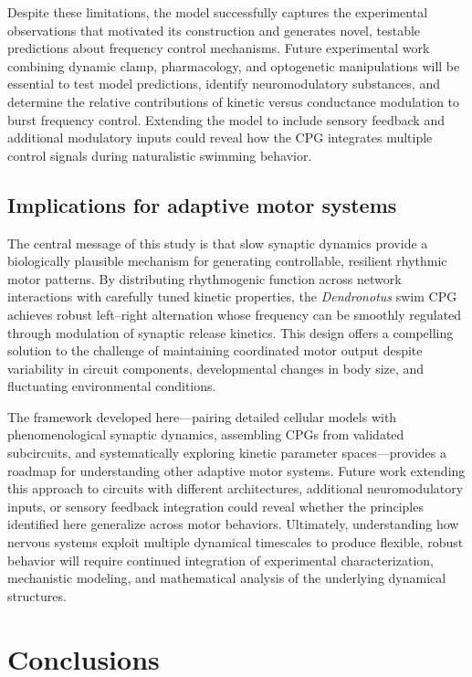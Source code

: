 \documentclass[nofootinbib,aip,amsmath,amssymb,preprint,twocolumn,floatfix,10pt]{revtex4-2}
\begin{document}
Despite these limitations, the model successfully captures the experimental observations that motivated its construction and generates novel, testable predictions about frequency control mechanisms. Future experimental work combining dynamic clamp, pharmacology, and optogenetic manipulations will be essential to test model predictions, identify neuromodulatory substances, and determine the relative contributions of kinetic versus conductance modulation to burst frequency control. Extending the model to include sensory feedback and additional modulatory inputs could reveal how the CPG integrates multiple control signals during naturalistic swimming behavior.

\subsection{Implications for adaptive motor systems}

The central message of this study is that slow synaptic dynamics provide a biologically plausible mechanism for generating controllable, resilient rhythmic motor patterns. By distributing rhythmogenic function across network interactions with carefully tuned kinetic properties, the \textit{Dendronotus} swim CPG achieves robust left--right alternation whose frequency can be smoothly regulated through modulation of synaptic release kinetics. This design offers a compelling solution to the challenge of maintaining coordinated motor output despite variability in circuit components, developmental changes in body size, and fluctuating environmental conditions.

The framework developed here---pairing detailed cellular models with phenomenological synaptic dynamics, assembling CPGs from validated subcircuits, and systematically exploring kinetic parameter spaces---provides a roadmap for understanding other adaptive motor systems. Future work extending this approach to circuits with different architectures, additional neuromodulatory inputs, or sensory feedback integration could reveal whether the principles identified here generalize across motor behaviors. Ultimately, understanding how nervous systems exploit multiple dynamical timescales to produce flexible, robust behavior will require continued integration of experimental characterization, mechanistic modeling, and mathematical analysis of the underlying dynamical structures.

\section{Conclusions}
\end{document}
